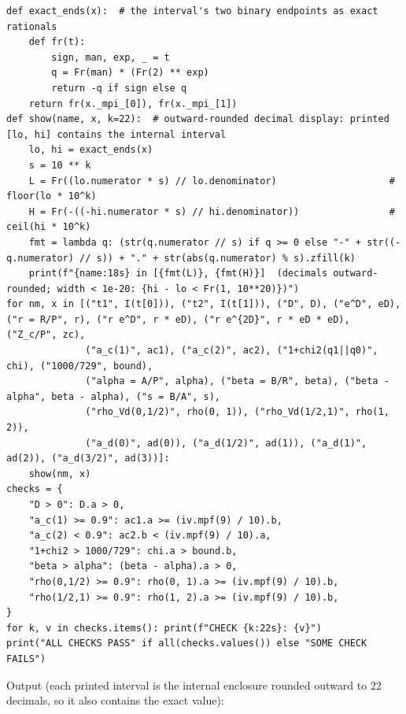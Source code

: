 \documentclass[11pt]{report}
\begin{document}
\begin{lstlisting}
def exact_ends(x):  # the interval's two binary endpoints as exact rationals
    def fr(t):
        sign, man, exp, _ = t
        q = Fr(man) * (Fr(2) ** exp)
        return -q if sign else q
    return fr(x._mpi_[0]), fr(x._mpi_[1])
def show(name, x, k=22):  # outward-rounded decimal display: printed [lo, hi] contains the internal interval
    lo, hi = exact_ends(x)
    s = 10 ** k
    L = Fr((lo.numerator * s) // lo.denominator)                    # floor(lo * 10^k)
    H = Fr(-((-hi.numerator * s) // hi.denominator))                # ceil(hi * 10^k)
    fmt = lambda q: (str(q.numerator // s) if q >= 0 else "-" + str((-q.numerator) // s)) + "." + str(abs(q.numerator) % s).zfill(k)
    print(f"{name:18s} in [{fmt(L)}, {fmt(H)}]  (decimals outward-rounded; width < 1e-20: {hi - lo < Fr(1, 10**20)})")
for nm, x in [("t1", I(t[0])), ("t2", I(t[1])), ("D", D), ("e^D", eD), ("r = R/P", r), ("r e^D", r * eD), ("r e^{2D}", r * eD * eD), ("Z_c/P", zc),
              ("a_c(1)", ac1), ("a_c(2)", ac2), ("1+chi2(q1||q0)", chi), ("1000/729", bound),
              ("alpha = A/P", alpha), ("beta = B/R", beta), ("beta - alpha", beta - alpha), ("s = B/A", s),
              ("rho_Vd(0,1/2)", rho(0, 1)), ("rho_Vd(1/2,1)", rho(1, 2)),
              ("a_d(0)", ad(0)), ("a_d(1/2)", ad(1)), ("a_d(1)", ad(2)), ("a_d(3/2)", ad(3))]:
    show(nm, x)
checks = {
    "D > 0": D.a > 0,
    "a_c(1) >= 0.9": ac1.a >= (iv.mpf(9) / 10).b,
    "a_c(2) < 0.9": ac2.b < (iv.mpf(9) / 10).a,
    "1+chi2 > 1000/729": chi.a > bound.b,
    "beta > alpha": (beta - alpha).a > 0,
    "rho(0,1/2) >= 0.9": rho(0, 1).a >= (iv.mpf(9) / 10).b,
    "rho(1/2,1) >= 0.9": rho(1, 2).a >= (iv.mpf(9) / 10).b,
}
for k, v in checks.items(): print(f"CHECK {k:22s}: {v}")
print("ALL CHECKS PASS" if all(checks.values()) else "SOME CHECK FAILS")
\end{lstlisting}
Output (each printed interval is the internal enclosure rounded outward to 22 decimals, so it also contains the exact value):
\end{document}
